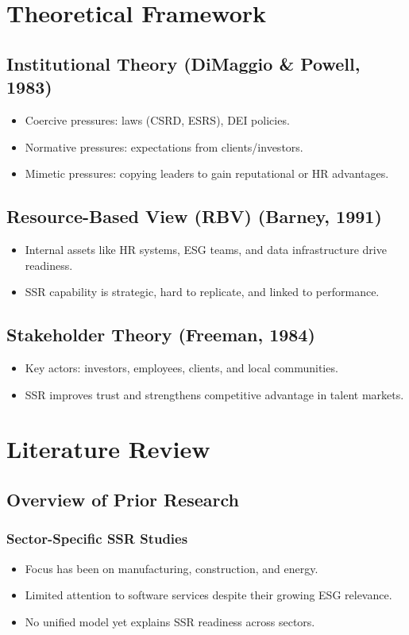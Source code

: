 \section{Theoretical Framework}
\subsection{Institutional Theory (DiMaggio \& Powell, 1983)}
\begin{itemize}
    \item Coercive pressures: laws (CSRD, ESRS), DEI policies.
    \item Normative pressures: expectations from clients/investors.
    \item Mimetic pressures: copying leaders to gain reputational or HR advantages.
\end{itemize}

\subsection{Resource-Based View (RBV) (Barney, 1991)}
\begin{itemize}
    \item Internal assets like HR systems, ESG teams, and data infrastructure drive readiness.
    \item SSR capability is strategic, hard to replicate, and linked to performance.
\end{itemize}

\subsection{Stakeholder Theory (Freeman, 1984)}
\begin{itemize}
    \item Key actors: investors, employees, clients, and local communities.
    \item SSR improves trust and strengthens competitive advantage in talent markets.
\end{itemize}

\section{Literature Review}

\subsection{Overview of Prior Research}
\subsubsection{Sector-Specific SSR Studies}
\begin{itemize}
    \item Focus has been on manufacturing, construction, and energy.
    \item Limited attention to software services despite their growing ESG relevance.
    \item No unified model yet explains SSR readiness across sectors.
\end{itemize}

